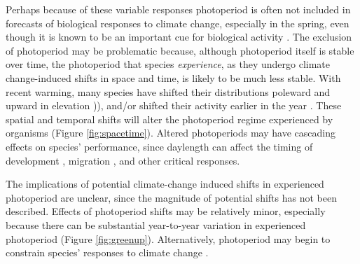 \documentclass{article}
\begin{document}
\par Perhaps because of these variable responses photoperiod is often not included in forecasts of biological responses to climate change, especially in the spring, even though it is known to be an important cue for biological activity \citep[but see ][]{duputie2015,Caffarra:2011qf}. 
The exclusion of photoperiod may be problematic because, although photoperiod itself is stable over time, the photoperiod that species \emph{experience}, as they undergo climate change-induced shifts in space and time, is likely to be much less stable. With recent warming, many species have shifted their distributions poleward and upward in elevation \citep[i.e., range shifts][]{parmesan2006,chen2011,harsch2009,penuelas2003})), and/or shifted their activity earlier in the year \citep[i.e., phenological shifts][]{parmesan2006, Wolkovich:2012n}. These spatial and temporal shifts will alter the photoperiod regime experienced by organisms (Figure \ref{fig:spacetime}). Altered photoperiods may have cascading effects on species' performance, since daylength can affect the timing of development \citep{muir1994}, migration \citep{dawbin1966}, and other critical responses. 
\par The implications of potential climate-change induced shifts in experienced photoperiod are unclear, since the magnitude of potential shifts has not been described. Effects of photoperiod shifts may be relatively minor, especially because there can be substantial year-to-year variation in experienced photoperiod (Figure \ref{fig:greenup}). Alternatively, photoperiod may begin to constrain species' responses to climate change \citep{koerner2010b}.
\end{document}
